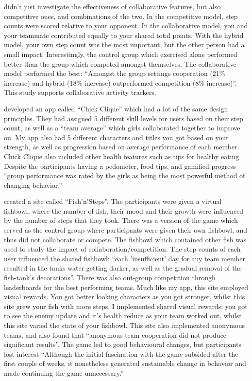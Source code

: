 \documentclass{l4proj}
\begin{document}
\citet{HealthyTogether} didn't just investigate the effectiveness of collaborative features, but also competitive ones, and combinations of the two. In the competitive model, step counts were scored relative to your opponent. In the collaborative model, you and your teammate contributed equally to your shared total points.  With the hybrid model, your own step count was the most important, but the other person had a small impact. Interestingly, the control group which exercised alone performed better than the group which competed amongst themselves. The collaborative model performed the best: ``Amongst the group settings cooperation (21\% increase) and hybrid (18\% increase) outperformed competition (8\% increase)''. This study supports collaborative activity trackers.

\citet{ChickClique} developed an app called ``Chick Clique'' which had a lot of the same design principles. They had assigned 5 different skill levels for users based on their step count, as well as a ``team average'' which girls collaborated together to improve on. My app also had 5 different characters and titles you got based on your strength, as well as progression based on average performance of each member. Chick Clique also included other health features such as tips for healthy eating. Despite the participants having a pedometer, food tips, and gamified progress ``group performance was rated by the girls as being the most powerful method of changing behavior.'' 

\citet{Fish'n'Steps} created a site called ``Fish'n'Steps''. The participants were given a virtual fishbowl, where the number of fish, their mood and their growth were influenced by the number of steps that they took. There was a version of the game which served as the control group where participants were given their own fishbowl, and thus did not collaborate or compete. The fishbowl which contained other fish was used to study the impact of collaboration/competition. The step counts of each user influenced the shared fishbowl: ``each 'insufficient' day for any team member resulted in the tanks water getting darker, as well as the gradual removal of the fish-tank’s decorations''. There was also out-group competition through leaderboards for the best performing teams. Much like my app, this site employed visual rewards. You got better looking characters as you got stronger, whilst this site grew your fish with more steps. I implemented shared visual rewards: you got to see the enemy update and it's health reduce as your team worked out, whilst this site varied the state of your fishbowl. This site also implemented anonymous teams, and also found that ``anonymous team cooperation did not produce significant results''.  The game led to good behavioural changes, but participants lost interest ``Although the initial fascination with the game subsided after the first couple of weeks, it nonetheless generated sustainable change in behavior and made continuing the game unnecessary.''
\end{document}
